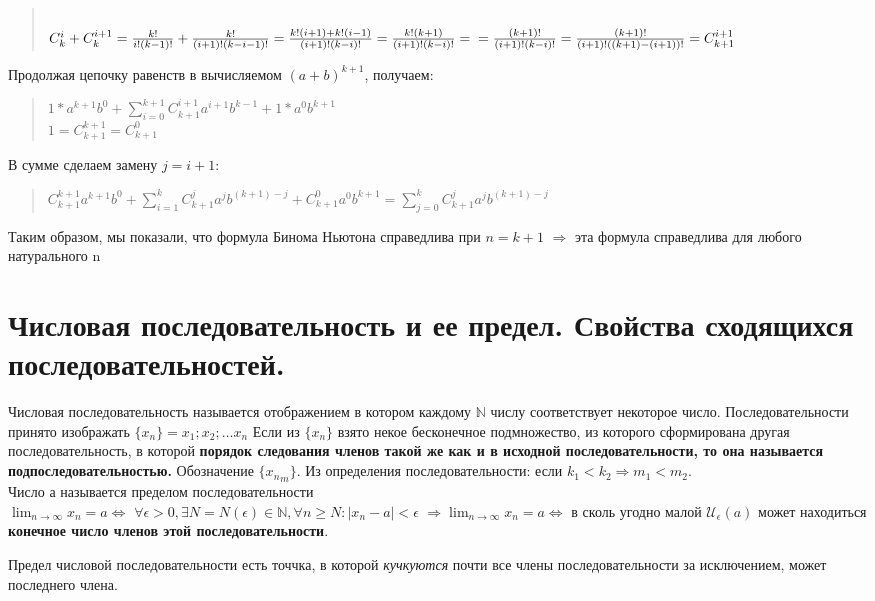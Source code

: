 \documentclass[oneside]{book}
\begin{document}
\begin{enumerate}
\begin{enumerate}
\begin{quote}
\\$C_k^i+C_k^{i+1}=\frac{k!}{i!(k-1)!}+\frac{k!}{(i+1)!(k-i-1)!}=\frac{k!(i+1)+k!(i-1)}{(i+1)!(k-i)!}=\frac{k!(k+1)}{(i+1)!(k-i)!}=\\=\frac{(k+1)!}{(i+1)!(k-i)!}=\frac{(k+1)!}{(i+1)!((k+1)-(i+1))!}=C_{k+1}^{i+1}$\end{quote}
Продолжая цепочку равенств в вычисляемом $(a+b)^{k+1}$, получаем:
\begin{quote}$1*a^{k+1}b^0+\sum\limits_{i=0}^{k+1}C_{k+1}^{i+1}a^{i+1}b^{k-1}+1*a^0b^{k+1}$\\
$1=C_{k+1}^{k+1}=C_{k+1}^0$\end{quote}
В сумме сделаем замену $j=i+1$:
\begin{quote}$C_{k+1}^{k+1}a^{k+1}b^0+\sum\limits_{i=1}^kC_{k+1}^ja^jb^{(k+1)-j}+C_{k+1}^0a^0b^{k+1}=\sum\limits_{j=0}^kC_{k+1}^j a^j b^{(k+1)-j}$
\end{quote}
Таким образом, мы показали, что формула Бинома Ньютона справедлива при $n=k+1$ $\Rightarrow$ эта формула справедлива для любого натурального n
\end{enumerate}
\setcounter{chapter}{4}
\chapter[Последовательности]{Числовая последовательность и ее предел. Свойства сходящихся последовательностей.}
Числовая последовательность называется отображением в котором каждому $\mathbb{N}$ числу соответствует
некоторое число. Последовательности принято изображать $\{x_n\} = x_1; x_2; \dots x_n$
Если из $\{x_n\}$ взято некое бесконечное подмножество, из которого сформирована другая последовательность,
в которой \textbf{порядок следования членов такой же как и в исходной последовательности, то она
	называется подпоследовательностью.} Обозначение $\{{x_n}_m\}$.
Из определения последовательности: если $k_1 < k_2 \Rightarrow m_1 < m_2$.\\
Число а называется пределом последовательности \\ $\lim_{n \rightarrow \infty}{x_n = a} \Leftrightarrow$
$\forall\epsilon>0,  \exists N=N(\epsilon) \in \mathbb{N}, \forall n \geq N: |x_n - a| < \epsilon$
$\Rightarrow \lim_{n \rightarrow \infty}{x_n = a} \Leftrightarrow$ в сколь угодно малой $\mathcal{U}_\epsilon(a)$
может находиться \textbf{конечное число членов этой последовательности}.

Предел числовой последовательности есть точчка, в которой \textit{кучкуются} почти все члены последовательности
за исключением, может последнего члена.


\end{enumerate}
\end{document}
